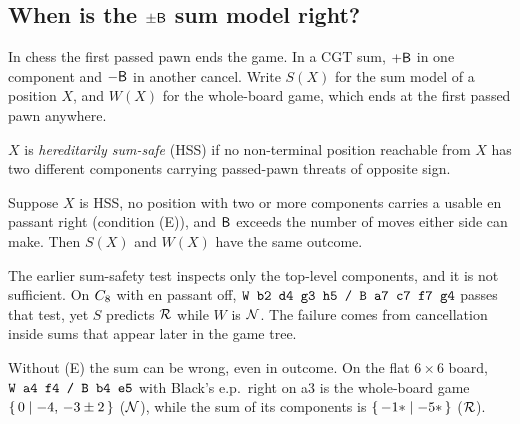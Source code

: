\subsection{When is the $\pm\mathsf{B}$ sum model right?}
In chess the first passed pawn ends the game. In a CGT sum, $+\mathsf{B}$ in one component and $-\mathsf{B}$ in another
cancel. Write $S(X)$ for the sum model of a position $X$, and $W(X)$ for the whole-board game, which ends at
the first passed pawn anywhere.
\begin{definition}
$X$ is \emph{hereditarily sum-safe} (HSS) if no non-terminal position reachable from $X$ has two different
components carrying passed-pawn threats of opposite sign.
\end{definition}
\begin{theorem}\label{thm:hss}
Suppose $X$ is HSS, no position with two or more components carries a usable en passant right
(condition (E)), and $\mathsf{B}$ exceeds the number of moves either side can make. Then $S(X)$ and $W(X)$ have the
same outcome.
\end{theorem}
\begin{proposition}\label{prop:sumsafe}
The earlier sum-safety test inspects only the top-level components, and it is not sufficient. On $C_{8}$ with
en passant off, $\texttt{W b2 d4 g3 h5 / B a7 c7 f7 g4}$ passes that test, yet $S$ predicts $\mathcal{R}$ while $W$
is $\mathcal{N}$. The failure comes from cancellation inside sums that appear later in the game tree.
\end{proposition}
\begin{proposition}
Without (E) the sum can be wrong, even in outcome. On the flat $6\times6$ board,
$\texttt{W a4 f4 / B b4 e5}$ with Black's e.p.\ right on a3 is the whole-board game
$\{\,0 \mid -4,\,-3\pm2\,\}$ ($\mathcal{N}$), while the sum of its components is $\{\,-1\mathord{\ast} \mid -5\mathord{\ast}\,\}$ ($\mathcal{R}$).
\end{proposition}
